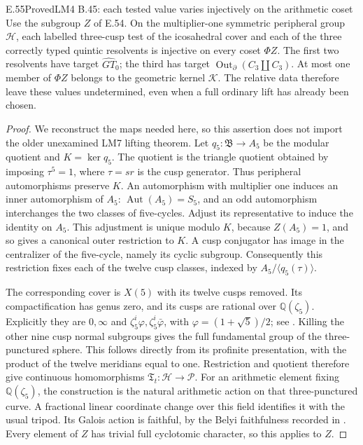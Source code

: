 \begin{result}{E.55}{Proved}{LM4 B.45: each tested value varies injectively on the arithmetic coset}
Use the subgroup \(Z\) of E.54. On the multiplier-one symmetric
peripheral group \(\mathcal H\), each labelled three-cusp test of
the icosahedral cover and each of the three correctly typed quintic
resolvents is injective on every coset \(\Phi Z\).
The first two resolvents have target \(\widehat{GT}_0\); the third
has target \(\operatorname{Out}_{\partial}(C_3\amalg C_3)\).
At most one member of \(\Phi Z\) belongs to the geometric kernel
\(\mathcal K\). The relative data therefore leave these values
undetermined, even when a full ordinary lift has already been chosen.
\end{result}
\begin{proof}
We reconstruct the maps needed here, so this assertion does not import
the older unexamined LM7 lifting theorem. Let \(q_5:\mathfrak B\to A_5\)
be the modular quotient and \(K=\ker q_5\). The quotient is the
triangle quotient obtained by imposing \(\tau^5=1\), where
\(\tau=sr\) is the cusp generator. Thus peripheral automorphisms
preserve \(K\). An automorphism with multiplier one induces an inner
automorphism of \(A_5\): \(\operatorname{Aut}(A_5)=S_5\), and an
odd automorphism interchanges the two classes of five-cycles. Adjust
its representative to induce the identity on \(A_5\). This adjustment
is unique modulo \(K\), because \(Z(A_5)=1\), and so gives a
canonical outer restriction to \(K\). A cusp conjugator has image
in the centralizer of the five-cycle, namely its cyclic subgroup.
Consequently this restriction fixes each of the twelve cusp classes,
indexed by \(A_5/\langle q_5(\tau)\rangle\).

The corresponding cover is \(X(5)\) with its twelve cusps removed.
Its compactification has genus zero, and its cusps are rational over
\(\mathbb Q(\zeta_5)\). Explicitly they are \(0,\infty\) and
\(\zeta_5^i\varphi,\zeta_5^i\bar\varphi\), with
\(\varphi=(1+\sqrt5)/2\); see
\citet[\S1.3]{SymFisher2003}. Killing the other nine cusp normal
subgroups gives the full fundamental group of the three-punctured
sphere. This follows directly from its profinite presentation, with
the product of the twelve meridians equal to one. Restriction and
quotient therefore give continuous homomorphisms
\(\mathfrak T_t:\mathcal H\to\mathcal P\).
For an arithmetic element fixing \(\mathbb Q(\zeta_5)\), the
construction is the natural arithmetic action on that three-punctured
curve. A fractional linear coordinate change over this field identifies
it with the usual tripod. Its Galois action is faithful, by the Belyi
faithfulness recorded in \citet[\S0.2 and Main Theorem(a)]{SymHarbaterSchneps2000}.
Every element of \(Z\) has trivial full cyclotomic character, so
this applies to \(Z\).


\end{proof}
